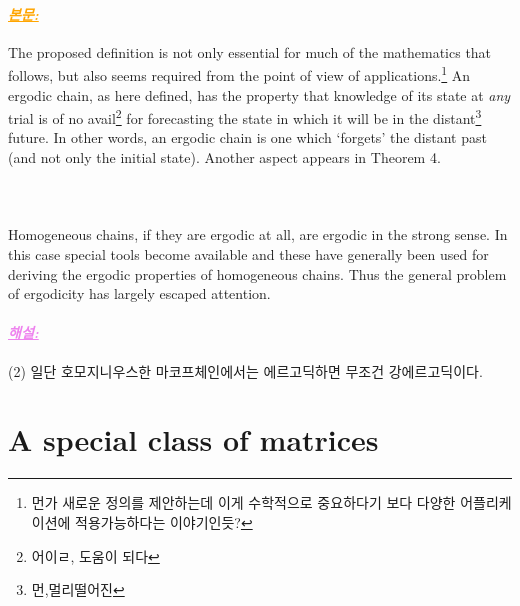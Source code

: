 \documentclass[12pt,oneside,english,a4paper]{article}
\def\bk{\paragraph{\LARGE$$}\LARGE}
\newcommand{\paraviolet}[1]{\paragraph{\LARGE\textcolor{violet}{\it\underline{\textbf{#1:}}}}\LARGE}
\newcommand{\paraorange}[1]{\paragraph{\LARGE\textcolor{orange}{\it\underline{\textbf{#1:}}}}\LARGE}
\begin{document}
\paraorange{본문} The proposed definition is not only essential for much of the mathematics that follows, but also seems required from the point of view of applications.\footnote{먼가 새로운 정의를 제안하는데 이게 수학적으로 중요하다기 보다 다양한 어플리케이션에 적용가능하다는 이야기인듯?} An ergodic chain, as here defined, has the property that knowledge of its state at \emph{any} trial is of no avail\footnote{어{}이ㄹ, 도움이 되다} for forecasting the state in which it will be in the distant\footnote{먼,멀리떨어진} future. In other words, an ergodic chain is one which `forgets' the distant past (and not only the initial state). Another aspect appears in Theorem 4. 
\bk Homogeneous chains, if they are ergodic at all, are ergodic in the strong sense. In this case special tools become available and these have generally been used for deriving the ergodic properties of homogeneous chains. Thus the general problem of ergodicity has largely escaped attention.

\paraviolet{해설} (2) 일단 호모지니우스한 마코프체인에서는 에르고딕하면 무조건 강에르고딕이다. 

\section{A special class of matrices}
\end{document}

